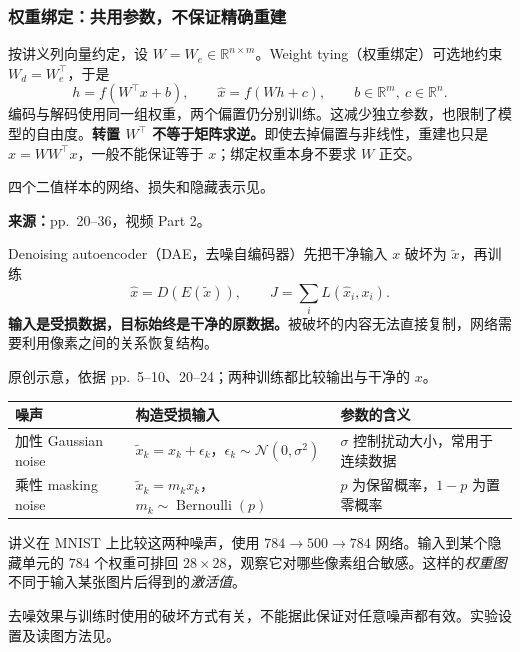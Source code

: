 \subsubsection{权重绑定：共用参数，不保证精确重建}

按讲义列向量约定，设 $W=W_e\in\mathbb R^{n\times m}$。Weight tying（权重绑定）可选地约束 $W_d=W_e^\top$，于是
\[
 h=f(W^\top x+b),\qquad \hat x=f(Wh+c),
 \qquad b\in\mathbb R^m,\ c\in\mathbb R^n.
\]
编码与解码使用同一组权重，两个偏置仍分别训练。这减少独立参数，也限制了模型的自由度。\textbf{转置 $W^\top$ 不等于矩阵求逆。}即使去掉偏置与非线性，重建也只是 $\hat x=WW^\top x$，一般不能保证等于 $x$；绑定权重本身不要求 $W$ 正交。

四个二值样本的网络、损失和隐藏表示见。


\textbf{来源：}pp.~20--36，视频 Part 2。

Denoising autoencoder（DAE，去噪自编码器）先把干净输入 $x$ 破坏为 $\tilde x$，再训练
\[
 \hat x=D(E(\tilde x)),\qquad J=\sum_i L(\hat x_i,x_i).
\]
\textbf{输入是受损数据，目标始终是干净的原数据。}被破坏的内容无法直接复制，网络需要利用像素之间的关系恢复结构。

\begin{center}

\end{center}
{\small 原创示意，依据 pp.~5--10、20--24；两种训练都比较输出与干净的 $x$。}

\begin{center}
\small
\begin{tabularx}{\textwidth}{@{}lXX@{}}
\toprule
噪声 & 构造受损输入 & 参数的含义 \\
\midrule
加性 Gaussian noise & $\tilde x_k=x_k+\epsilon_k$，$\epsilon_k\sim\mathcal N(0,\sigma^2)$ & $\sigma$ 控制扰动大小，常用于连续数据 \\
乘性 masking noise & $\tilde x_k=m_kx_k$，$m_k\sim\operatorname{Bernoulli}(p)$ & $p$ 为保留概率，$1-p$ 为置零概率 \\
\bottomrule
\end{tabularx}
\end{center}

讲义在 MNIST 上比较这两种噪声，使用 $784\to500\to784$ 网络。输入到某个隐藏单元的 $784$ 个权重可排回 $28\times28$，观察它对哪些像素组合敏感。这样的\emph{权重图}不同于输入某张图片后得到的\emph{激活值}。

去噪效果与训练时使用的破坏方式有关，不能据此保证对任意噪声都有效。实验设置及读图方法见。

